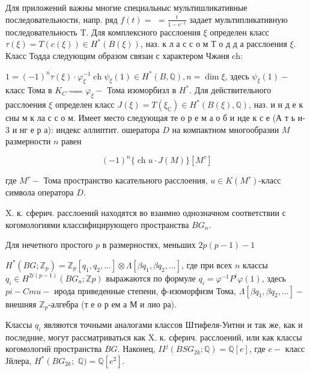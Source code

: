 \documentclass[10pt]{article}
\begin{document}
Для приложений важны многие специальныс мультишликативные последовательности, напр. ряд $f(t)=$ $=\frac{t}{1-e^{-t}}$ задает мультипликативную последовательность T. Для комплексного расслоения $\xi$ определен класс $\tau(\xi)=T(c(\xi)) \in H^{*}(B(\xi))$, наз. к л а с с о м Т о д д а расслоения $\xi$. Класс Тодда следующим образом связан с характером Чжәня ch:



$1=(-1)^{n} \tau(\xi) \cdot \varphi_{\xi}^{-1} \operatorname{ch} \psi_{\xi}(1) \in H^{*}(B, \mathbb{Q}), n=\operatorname{dim} \xi$, здесь $\psi_{\xi}(1)-$ класс Тома в $K_{C^{-т е о р и и, ~}} \varphi_{\xi}-$ Тома изоморбизл в $H^{*}$. Для действительного расслоения $\xi$ определен класс $J(\xi)=T\left(\xi_{\mathbb{C}}\right) \in H^{*}(B(\xi), \mathbb{Q})$, наз. и н д е к сны м к ла с с о м. Имеет место следующая те о р е м а о б и нде к с е (А т ь и- 3 и нг е р а): индекс әллиптит. ошератора $D$ на компактном многообразии $M$ размерности $n$ равен



\[

(-1)^{n}\{\operatorname{ch} u \cdot J(M)\}\left[M^{\tau}\right]

\]



где $M^{\tau}-$ Тома пространство касательного расслоения, $u \in K\left(M^{\tau}\right)$-класс символа оператора $D$.



X. к. сферич. расслоений находятся во взаимно однозначном соответствии с когомологиями классифицирующего пространства $B G_{n}$.



Для нечетного простого $p$ в размерностях, меньших $2 p(p-1)-1$



$H^{*}\left(B G ; \mathbb{Z}_{p}\right)=\mathbb{Z}_{p}\left[q_{1}, q_{2}, \ldots\right] \otimes \Lambda\left[\beta q_{1}, \beta q_{2}, \ldots\right]$, где при всех $n$ классы $q_{i} \in H^{2 i(p-1)}\left(B G_{n} ; \mathbb{Z} p\right)$ выражаются по формуле $q_{i}=\varphi^{-1} P^{i} \varphi(1)$, здесь $p i-C m u-$ ирода приведенные степени, $ф$-изоморфизм Тома, $\Lambda\left[\beta q_{1}, \beta q_{2}, \ldots\right]-$ внешняя $\mathbb{Z}_{p}$-алгебра (т е о р ем а М и лио ра).



Классы $q_{i}$ являются точными аналогами классов Штифеля-Уитни и так же, как и последние, могут рассматриваться как $\mathrm{X}$. к. сферич. расслоений, или как классы когомологий пространства $B G$. Наконец, $I I^{j}\left(B S G_{2 k} ; \mathbb{Q}\right)=\mathbb{Q}[e]$, где $e-$ класс Јйлера, $H^{*}\left(B G_{2 k} ;\right.$ $\mathbb{Q})=\mathbb{Q}\left[e^{2}\right]$.
\end{document}

